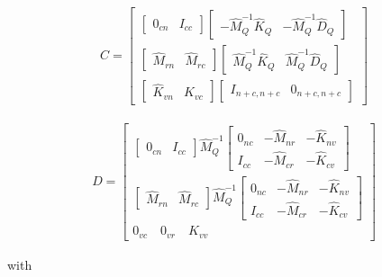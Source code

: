 \documentclass{ifacconf}
\begin{document}
\begin{eqnarray} \label{eq:CTITOP}
C = \begin{bmatrix}
\begin{bmatrix}
0_{cn} & I_{cc} \end{bmatrix} \begin{bmatrix} -\hat{M}_Q^{-1} \hat{K}_Q
& -\hat{M}_Q^{-1} \hat{D}_Q
\end{bmatrix} \\
\begin{bmatrix}
\hat{M}_{rn} & \hat{M}_{rc}\end{bmatrix} \begin{bmatrix}\hat{M}_Q^{-1} \hat{K}_Q
& \hat{M}_Q^{-1} \hat{D}_Q
\end{bmatrix}\\
\begin{bmatrix}
\hat{K}_{vn} & \hat{K}_{vc}\end{bmatrix} \begin{bmatrix} I_{n+c,n+c} & 0_{n+c,n+c}
\end{bmatrix}
\end{bmatrix} 
\end{eqnarray}



\begin{eqnarray} \label{eq:DTITOP}
D = \begin{bmatrix}
\begin{bmatrix}
0_{cn} & I_{cc} \end{bmatrix}  \hat{M}_Q^{-1} \begin{bmatrix}
0_{nc}& -\hat{M}_{nr} & -\hat{K}_{nv} \\
I_{cc}& -\hat{M}_{cr} & -\hat{K}_{cv}
\end{bmatrix} \\
\begin{bmatrix}
\hat{M}_{rn} & \hat{M}_{rc}\end{bmatrix} \hat{M}_Q^{-1} \begin{bmatrix}
0_{nc}& -\hat{M}_{nr} & -\hat{K}_{nv} \\
I_{cc}& -\hat{M}_{cr} & -\hat{K}_{cv}
\end{bmatrix} \\
0_{vc} \quad 0_{vr} \quad K_{vv}
\end{bmatrix} 
\end{eqnarray}


with 
\end{document}
